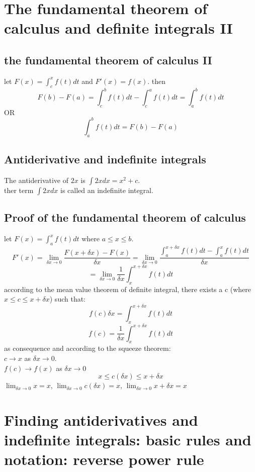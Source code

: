 \documentclass{article}
\begin{document}
        \section{The fundamental theorem of calculus and definite integrals II}
                \subsection{the fundamental theorem of calculus II}
                    let \(F(x) = \int_{c}^{x} f(t)dt\) and \(F'(x) = f(x)\). 
                    then 
                        \[F(b) - F(a) = \int_{c}^{b} f(t)dt - \int_{c}^{a} f(t)dt = \int_{a}^{b} f(t)dt\]
                    OR 
                        \[\int_{a}^{b} f(t)dt = F(b) - F(a)\]
                \subsection{Antiderivative and indefinite integrals}
                    The antiderivative of \(2x\) is \(\int 2x dx = x^{2} + c\).\\ 
                    ther term \(\int 2x dx \) is called an indefinite integral. 
                \subsection{Proof of the fundamental theorem of calculus}
                    let \(F(x) = \int_{a}^{x} f(t)dt\) where \(a \le x \le b\). 
                        \[F'(x) = \lim_{\delta x \to 0} \frac{F(x + \delta x) - F(x)}{\delta x} = \lim_{\delta x \to 0} \frac{\int_{a}^{x + \delta x} f(t)dt - \int_{a}^{x} f(t)dt }{\delta x} \] 
                        \[= \lim_{\delta x \to 0} \frac{1}{\delta x} \int_{x}^{x + \delta x} f(t) dt\]
                    according to the mean value theorem of definite integral, there exists  a c (where \(x \le c \le x + \delta x\)) such that: \[f(c)\delta x = \int_{x}^{x + \delta x} f(t)dt\]
                    \[f(c) = \frac{1}{\delta x}\int_{x}^{x + \delta x} f(t)dt\]
                    as consequence and according to the squeeze theorem: \\
                        \(c \to x  \) as \(\delta x \to 0\).\\ 
                        \(f(c) \to f(x)\) as  \(\delta x \to 0 \)
                            \[x \le c(\delta x) \le x + \delta x\]
                    \(\lim_{\delta x \to 0 } x = x\), \(\lim_{\delta x \to 0 } c(\delta x) = x\), \(\lim_{\delta x \to 0 } x + \delta x = x\)
        \section{Finding antiderivatives and indefinite integrals: basic rules and notation: reverse power rule}
\end{document}
